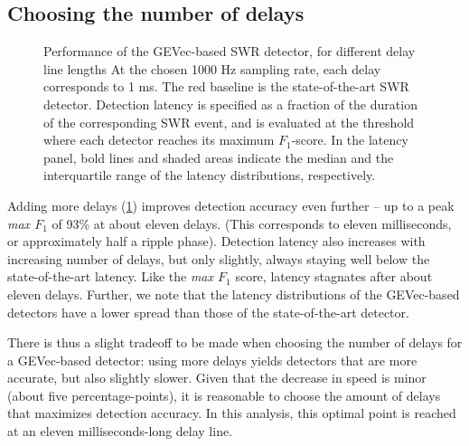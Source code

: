 \subsection{Choosing the number of delays}

\begin{figure}
\captionn
{Performance of the GEVec-based SWR detector, for different delay line lengths}
{At the chosen 1000 Hz sampling rate, each delay corresponds to 1 ms. The red baseline is the state-of-the-art SWR detector. Detection latency is specified as a fraction of the duration of the corresponding SWR event, and is evaluated at the threshold where each detector reaches its maximum $F_1$-score. In the latency panel, bold lines and shaded areas indicate the median and the interquartile range of the latency distributions, respectively.}
\label{fig:num-delays}
\end{figure}

Adding more delays (\cref{fig:num-delays}) improves detection accuracy even further -- up to a peak \emph{max $F_1$} of 93\% at about eleven delays. (This corresponds to eleven milliseconds, or approximately half a ripple phase). Detection latency also increases with increasing number of delays, but only slightly, always staying well below the state-of-the-art latency. Like the \emph{max $F_1$} score, latency stagnates after about eleven delays. Further, we note that the latency distributions of the GEVec-based detectors have a lower spread than those of the state-of-the-art detector.

There is thus a slight tradeoff to be made when choosing the number of delays for a GEVec-based detector: using more delays yields detectors that are more accurate, but also slightly slower. Given that the decrease in speed is minor (about five percentage-points), it is reasonable to choose the amount of delays that maximizes detection accuracy. In this analysis, this optimal point is reached at an eleven milliseconds-long delay line.

